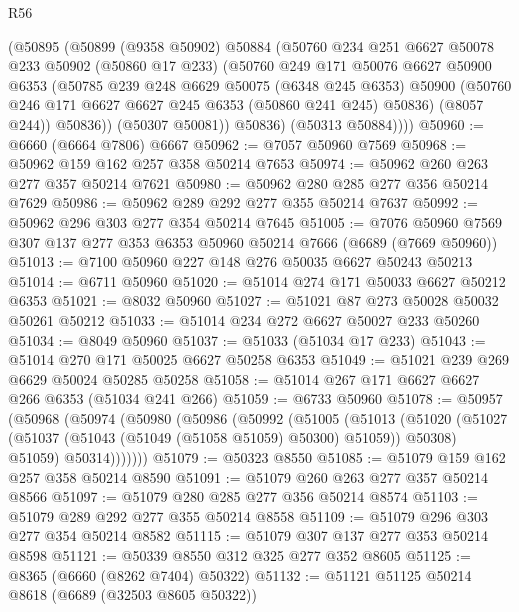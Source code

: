 \begin{lexlean}{R56}
\begin{coremodule}
          (@50895
            (@50899
              (@9358 @50902)
              @50884
              (@50760
                @234
                @251
                @6627
                @50078
                @233
                @50902
                (@50860 @17 @233)
                (@50760
                  @249
                  @171
                  @50076
                  @6627
                  @50900
                  @6353
                  (@50785
                    @239
                    @248
                    @6629
                    @50075
                    (@6348 @245 @6353)
                    @50900
                    (@50760 @246 @171 @6627 @6627 @245 @6353 (@50860 @241 @245) @50836)
                    (@8057 @244))
                  @50836))
              (@50307 @50081))
            @50836)
          (@50313 @50884))))
@50960 := @6660 (@6664 @7806) @6667
@50962 := @7057 @50960 @7569
@50968 := @50962 @159 @162 @257 @358 @50214 @7653
@50974 := @50962 @260 @263 @277 @357 @50214 @7621
@50980 := @50962 @280 @285 @277 @356 @50214 @7629
@50986 := @50962 @289 @292 @277 @355 @50214 @7637
@50992 := @50962 @296 @303 @277 @354 @50214 @7645
@51005 := @7076 @50960 @7569 @307 @137 @277 @353 @6353 @50960 @50214 @7666 (@6689 (@7669 @50960))
@51013 := @7100 @50960 @227 @148 @276 @50035 @6627 @50243 @50213
@51014 := @6711 @50960
@51020 := @51014 @274 @171 @50033 @6627 @50212 @6353
@51021 := @8032 @50960
@51027 := @51021 @87 @273 @50028 @50032 @50261 @50212
@51033 := @51014 @234 @272 @6627 @50027 @233 @50260
@51034 := @8049 @50960
@51037 := @51033 (@51034 @17 @233)
@51043 := @51014 @270 @171 @50025 @6627 @50258 @6353
@51049 := @51021 @239 @269 @6629 @50024 @50285 @50258
@51058 := @51014 @267 @171 @6627 @6627 @266 @6353 (@51034 @241 @266)
@51059 := @6733 @50960
@51078 := @50957
    (@50968
      (@50974
        (@50980
          (@50986
            (@50992
              (@51005
                (@51013
                  (@51020
                    (@51027 (@51037 (@51043 (@51049 (@51058 @51059) @50300) @51059)) @50308)
                    @51059)
                  @50314)))))))
@51079 := @50323 @8550
@51085 := @51079 @159 @162 @257 @358 @50214 @8590
@51091 := @51079 @260 @263 @277 @357 @50214 @8566
@51097 := @51079 @280 @285 @277 @356 @50214 @8574
@51103 := @51079 @289 @292 @277 @355 @50214 @8558
@51109 := @51079 @296 @303 @277 @354 @50214 @8582
@51115 := @51079 @307 @137 @277 @353 @50214 @8598
@51121 := @50339 @8550 @312 @325 @277 @352 @8605
@51125 := @8365 (@6660 (@8262 @7404) @50322)
@51132 := @51121 @51125 @50214 @8618 (@6689 (@32503 @8605 @50322))

\end{coremodule}
\end{lexlean}
